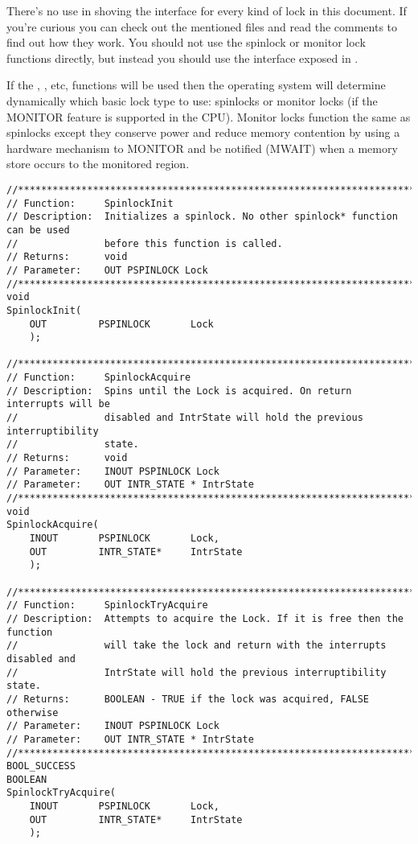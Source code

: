 \begin{appendices}
There's no use in shoving the interface for every kind of lock in this document. If you're curious 
you can check out the mentioned files and read the comments to find out how they work. You should
 not use the spinlock or monitor lock functions directly, but instead you should use the interface
 exposed in .

If the , , etc, functions will be used then the operating system
will determine dynamically which basic lock type to use: spinlocks or monitor locks (if the MONITOR
feature is supported in the CPU). Monitor locks function the same as spinlocks except they conserve
power and reduce memory contention by using a hardware mechanism to MONITOR and be notified (MWAIT)
when a memory store occurs to the monitored region.

\begin{lstlisting}[caption={Spinlock Interface},label={lst:Spinlock}]
//******************************************************************************
// Function:     SpinlockInit
// Description:  Initializes a spinlock. No other spinlock* function can be used
//               before this function is called.
// Returns:      void
// Parameter:    OUT PSPINLOCK Lock
//******************************************************************************
void
SpinlockInit(
    OUT         PSPINLOCK       Lock
    );

//******************************************************************************
// Function:     SpinlockAcquire
// Description:  Spins until the Lock is acquired. On return interrupts will be
//               disabled and IntrState will hold the previous interruptibility
//               state.
// Returns:      void
// Parameter:    INOUT PSPINLOCK Lock
// Parameter:    OUT INTR_STATE * IntrState
//******************************************************************************
void
SpinlockAcquire(
    INOUT       PSPINLOCK       Lock,
    OUT         INTR_STATE*     IntrState
    );

//******************************************************************************
// Function:     SpinlockTryAcquire
// Description:  Attempts to acquire the Lock. If it is free then the function
//               will take the lock and return with the interrupts disabled and
//               IntrState will hold the previous interruptibility state.
// Returns:      BOOLEAN - TRUE if the lock was acquired, FALSE otherwise
// Parameter:    INOUT PSPINLOCK Lock
// Parameter:    OUT INTR_STATE * IntrState
//******************************************************************************
BOOL_SUCCESS
BOOLEAN
SpinlockTryAcquire(
    INOUT       PSPINLOCK       Lock,
    OUT         INTR_STATE*     IntrState
    );


\end{lstlisting}
\end{appendices}
